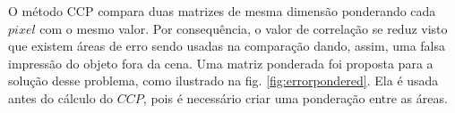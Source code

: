 O método CCP compara duas matrizes de mesma dimensão ponderando cada $pixel$ com o mesmo valor. 
Por consequência, o valor de correlação se reduz visto que existem áreas de erro sendo usadas na comparação
dando, assim, uma falsa impressão do objeto fora da cena. 
Uma matriz ponderada foi proposta para a solução desse problema, como ilustrado na fig. \ref{fig:errorpondered}. 
Ela é usada antes do cálculo do $CCP$, pois é necessário criar uma ponderação entre as áreas.

